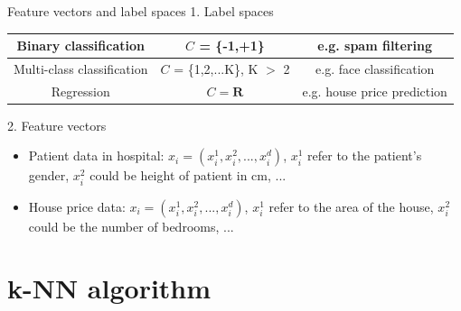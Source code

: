 \documentclass[aspectratio=1610]{beamer}
\begin{document}
\begin{frame}{Feature vectors and label spaces}
1. Label spaces\\
\begin{center}
\begin{tabular}{|c|c|c|} 

 \hline
 Binary classification & $C$ = \{-1,+1\} & e.g. spam filtering\\ 
 \hline
 Multi-class classification & $C$ = \{1,2,...K\}, K $>$ 2 & e.g. face classification\\
 \hline
 Regression & $C = \textbf{R}$ &  e.g. house price prediction \\
 \hline
\end{tabular}
\end{center}
    
2. Feature vectors
\begin{itemize}
    \item Patient data in hospital: $x_i = (x_i^1, x_i^2,...,x_i^d)$, $x_i^1$ refer to the patient's gender, $x_i^2$ could be height of patient in cm, ...
    \item House price data: $x_i = (x_i^1, x_i^2,...,x_i^d)$, $x_i^1$ refer to the area of the house, $x_i^2$ could be the number of bedrooms, ...
\end{itemize}
    
\end{frame}

\section{k-NN algorithm}
\end{document}
